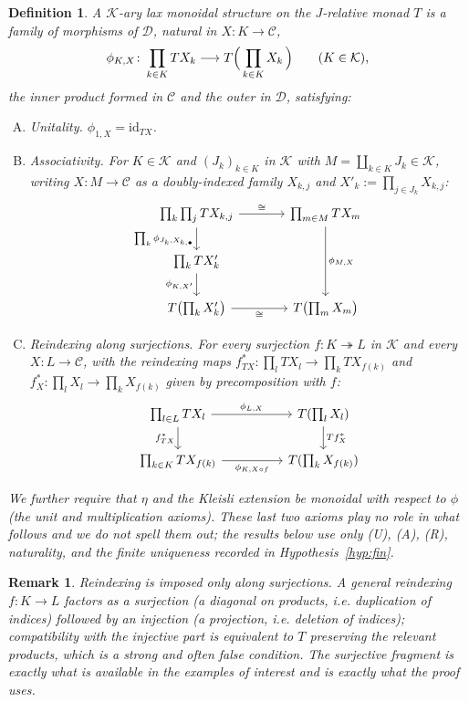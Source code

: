 \documentclass{article}
\newtheorem{definition}{Definition}
\newtheorem{remark}{Remark}
\newcommand{\C}{\mathcal{C}}
\newcommand{\D}{\mathcal{D}}
\newcommand{\K}{\mathcal{K}}
\newcommand{\id}{\mathrm{id}}
\begin{document}
\begin{definition}\label{def:structure}
A \emph{$\K$-ary lax monoidal structure} on the $J$-relative monad $T$ is a
family of morphisms of $\D$, natural in $X\colon K\to\C$,
\[
  \phi_{K,X}\colon \prod_{k\in K} T X_k \longrightarrow T\Bigl(\,\prod_{k\in K} X_k\,\Bigr)
  \qquad (K\in\K),
\]
the inner product formed in $\C$ and the outer in $\D$, satisfying:
\begin{enumerate}[(U)]
  \item[(U)] \emph{Unitality.} $\phi_{1,X}=\id_{TX}$.
  \item[(A)] \emph{Associativity.} For $K\in\K$ and $(J_k)_{k\in K}$ in $\K$
  with $M=\coprod_{k\in K}J_k\in\K$, writing $X\colon M\to\C$ as a doubly-indexed
  family $X_{k,j}$ and $X'_k:=\prod_{j\in J_k}X_{k,j}$:
  \[
  \begin{tikzcd}[column sep=large]
    {\prod_{k}\prod_{j} TX_{k,j}} \arrow[r,"\cong"] \arrow[d,"{\prod_k\phi_{J_k,X_{k,\bullet}}}"'] & {\prod_{m\in M} TX_m} \arrow[dd,"{\phi_{M,X}}"]\\
    {\prod_{k} T X'_k} \arrow[d,"{\phi_{K,X'}}"'] & \\
    {T\bigl(\prod_k X'_k\bigr)} \arrow[r,"\cong"'] & {T\bigl(\prod_{m} X_m\bigr)}
  \end{tikzcd}
  \]
  \item[(R)] \emph{Reindexing along surjections.} For every surjection
  $f\colon K\twoheadrightarrow L$ in $\K$ and every $X\colon L\to\C$, with the
  reindexing maps $f^{*}_{TX}\colon\prod_{l}TX_l\to\prod_{k}TX_{f(k)}$ and
  $f^{*}_{X}\colon\prod_l X_l\to\prod_k X_{f(k)}$ given by precomposition with
  $f$:
  \[
  \begin{tikzcd}[column sep=huge]
    {\prod_{l\in L} TX_l} \arrow[r,"\phi_{L,X}"] \arrow[d,"f^{*}_{TX}"'] & {T(\prod_{l} X_l)} \arrow[d,"T f^{*}_{X}"]\\
    {\prod_{k\in K} TX_{f(k)}} \arrow[r,"\phi_{K,X\circ f}"'] & {T(\prod_{k} X_{f(k)})}
  \end{tikzcd}
  \]
\end{enumerate}
We further require that $\eta$ and the Kleisli extension be monoidal with
respect to $\phi$ (the unit and multiplication axioms). These last two axioms
play no role in what follows and we do not spell them out; the results below use
only \textnormal{(U)}, \textnormal{(A)}, \textnormal{(R)}, naturality, and the
finite uniqueness recorded in Hypothesis~\ref{hyp:fin}.
\end{definition}

\begin{remark}
Reindexing is imposed only along \emph{surjections}. A general reindexing
$f\colon K\to L$ factors as a surjection (a diagonal on products, i.e.
duplication of indices) followed by an injection (a projection, i.e. deletion of
indices); compatibility with the injective part is equivalent to $T$ preserving
the relevant products, which is a strong and often false condition. The
surjective fragment is exactly what is available in the examples of interest and
is exactly what the proof uses.
\end{remark}
\end{document}
